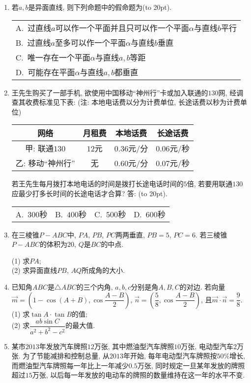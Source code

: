 \documentclass[10pt,a4paper]{article}
\newcommand{\bracket}[1]{(\hbox to #1pt{})}
\newcommand{\onech}[4]{\par\begin{tabular}{p{.9\textwidth}}
A.~#1\\
B.~#2\\
C.~#3\\
D.~#4
\end{tabular}}
\newcommand{\fourch}[4]{\par\begin{tabular}{p{.23\textwidth}p{.23\textwidth}p{.23\textwidth}p{.23\textwidth}}
A.~#1 &B.~#2& C.~#3& D.~#4
\end{tabular}}
\begin{document}
\begin{enumerate}[1.]
\item 若$a,b$是异面直线, 则下列命题中的假命题为\bracket{20}.
\onech{过直线$a$可以作一个平面并且只可以作一个平面$\alpha$与直线$b$平行}{过直线$a$至多可以作一个平面$\alpha$与直线$b$垂直}{唯一存在一个平面$\alpha$与直线$a,b$等距}{可能存在平面$\alpha$与直线$a,b$都垂直}
\item 王先生购买了一部手机, 欲使用中国移动``神州行''卡或加入联通的$130$网, 经调查其收费标准见下表: (注: 本地电话费以分为计费单位, 长途话费以秒为计费单位)
\begin{center}
\begin{tabular}{|c|c|c|c|}
\hline
网络 & 月租费 & 本地话费 & 长途话费 \\ \hline
甲: 联通$130$ & $12$元 & $0.36$元/分 & $0.06$元/秒 \\ \hline
乙: 移动``神州行'' & 无 & $0.60$元/分 & $0.07$元/秒 \\ \hline
\end{tabular}
\end{center}
若王先生每月拨打本地电话的时间是拨打长途电话时间的$5$倍, 若要用联通$130$应最少打多长时间的长途电话才合算?  答: \bracket{20}.
\fourch{$300$秒}{$400$秒}{$500$秒}{$600$秒}
\item 在三棱锥$P-ABC$中, $PA$, $PB$, $PC$两两垂直, $PB=5$, $PC=6$. 若三棱锥$P-ABC$的体积为$20$, $Q$是$BC$的中点.
\begin{center}
\end{center}
(1) 求$PA$;\\
(2) 求异面直线$PB$, $AQ$所成角的大小.
\item 已知角$ABC$是$\triangle ABC$的三个内角, $a,b,c$分别是角$A,B,C$的对边. 若向量$\overrightarrow m=(1-\cos(A+B),\cos\dfrac{A-B}2)$, $\overrightarrow n=(\dfrac 58,\cos\dfrac{A-B}2)$, 且$\overrightarrow  m\cdot \overrightarrow  n=\dfrac 98$.\\
(1) 求$\tan A\cdot \tan B$的值;\\
(2) 求$\dfrac{ab\sin C}{a^2+b^2-c^2}$的最大值.
\item 某市$2013$年发放汽车牌照$12$万张, 其中燃油型汽车牌照$10$万张, 电动型汽车$2$万张. 为了节能减排和控制总量, 从$2013$年开始, 每年电动型汽车牌照按$50\%$增长, 而燃油型汽车牌照每一年比上一年减少$0.5$万张, 同时规定一旦某年发放的牌照超过$15$万张, 以后每一年发放的电动车的牌照的数量维持在这一年的水平不变.

\end{enumerate}
\end{document}
